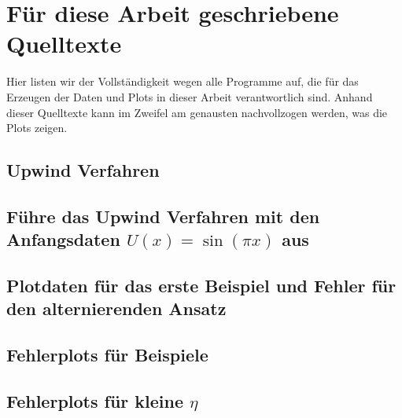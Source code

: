 \section{Für diese Arbeit geschriebene Quelltexte}
\label{appendix:transport:beispiel}

Hier listen wir der Vollständigkeit wegen alle Programme auf, die für das Erzeugen der Daten und Plots in dieser Arbeit verantwortlich sind.
Anhand dieser Quelltexte kann im Zweifel am genausten nachvollzogen werden, was die Plots zeigen.

\subsection*{Upwind Verfahren}


\subsection*{Führe das Upwind Verfahren mit den Anfangsdaten $U(x) = \sin(\pi x)$ aus}


\subsection*{Plotdaten für das erste Beispiel und Fehler für den alternierenden Ansatz}


\subsection*{Fehlerplots für Beispiele}


\subsection*{Fehlerplots für kleine $\eta$}
